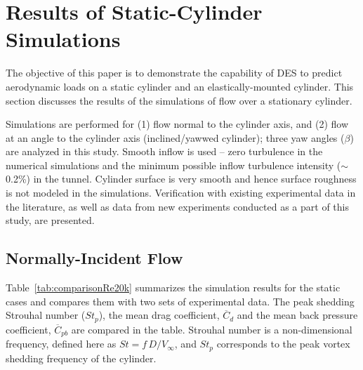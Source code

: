 \section{Results of Static-Cylinder Simulations}
\label{sec:comp_results}
%
The objective of this paper is to demonstrate the capability of DES to predict
aerodynamic loads on a static cylinder and an elastically-mounted cylinder.
This section discusses the results of the simulations of flow over a stationary
cylinder. 

Simulations are performed for (1) flow normal to the cylinder axis, and (2)
flow at an angle to the cylinder axis (inclined/yawwed cylinder); three yaw
angles ($\beta$) are analyzed in this study. Smooth inflow is used -- zero
turbulence in the numerical simulations and the minimum possible inflow
turbulence intensity ($\sim$0.2\%) in the tunnel. Cylinder surface is very
smooth and hence surface roughness is not modeled in the simulations.
Verification with existing experimental data in the literature, as well as data
from new experiments conducted as a part of this study, are presented. 

\subsection{Normally-Incident Flow}
\label{sec:normally_incident}
%
Table~\ref{tab:comparisonRe20k} summarizes the simulation results for the
static cases and compares them with two sets of experimental data. The peak
shedding Strouhal number ($St_p$), the mean drag coefficient, $\overline{C}_d$
and the mean back pressure coefficient, $\overline{C}_{pb}$ are compared in the
table. Strouhal number is a non-dimensional frequency, defined here as $St =
f\,D/V_\infty$, and $St_p$ corresponds to the peak vortex shedding frequency of
the cylinder.

